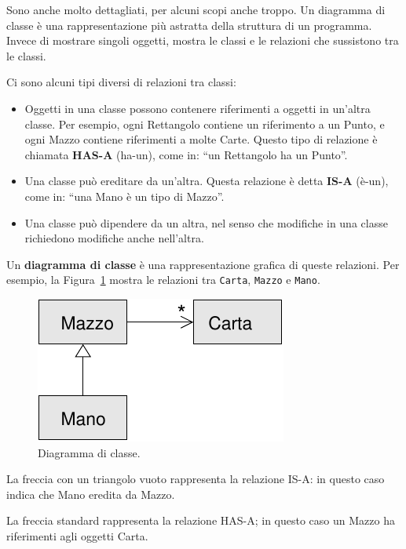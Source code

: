 \documentclass[10pt]{book}
\begin{document}
Sono anche molto dettagliati, per alcuni scopi anche troppo. Un diagramma di classe è una rappresentazione più astratta della struttura di un programma. Invece di mostrare singoli oggetti, mostra le classi e le relazioni che sussistono tra le classi.

Ci sono alcuni tipi diversi di relazioni tra classi:

\begin{itemize}

\item Oggetti in una classe possono contenere riferimenti a oggetti in un'altra classe. Per esempio, ogni Rettangolo contiene un riferimento a un Punto, e ogni Mazzo contiene riferimenti a molte Carte. Questo tipo di relazione è chiamata {\bf HAS-A} (ha-un), come in: ``un Rettangolo ha un Punto''.

\item Una classe può ereditare da un'altra. Questa relazione è detta {\bf IS-A} (è-un), come in: ``una Mano è un tipo di Mazzo''.

\item Una classe può dipendere da un altra, nel senso che modifiche in una classe richiedono modifiche anche nell'altra.

\end{itemize}

Un {\bf diagramma di classe} è una rappresentazione grafica di queste relazioni.  Per esempio, la Figura~\ref{fig.class1} mostra le relazioni tra {\tt Carta}, {\tt Mazzo} e {\tt Mano}.

\begin{figure}
\centerline
{\includegraphics[scale=0.8]{figs/class1.pdf}}
\caption{Diagramma di classe.}
\label{fig.class1}
\end{figure}


La freccia con un triangolo vuoto rappresenta la relazione IS-A: in questo caso indica che Mano eredita da Mazzo.

La freccia standard rappresenta la relazione HAS-A; in questo caso un Mazzo ha riferimenti agli oggetti Carta.
\end{document}
